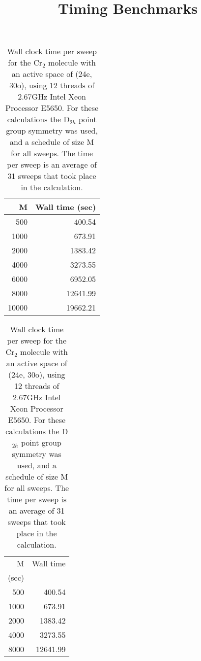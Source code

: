 \documentclass[letterpaper,12pt,notitlepage]{article}
\title{Timing Benchmarks}
\begin{document}

\begin{table}
\begin{center}
 \begin{tabular}{rr}
  \hline
  \hline
M& Wall time (sec)\\
\hline
500     &400.54\\
1000	&673.91\\
2000	&1383.42\\
4000	&3273.55\\
6000	&6952.05\\
8000	&12641.99\\
10000	&19662.21\\
\hline
  \hline
 \end{tabular}
\end{center}
\caption{Wall clock time per sweep for the Cr$_2$ molecule with an active space
of (24e, 30o), using 12 threads of 2.67GHz Intel Xeon Processor E5650. For
these calculations the D$_{2h}$ point group symmetry was used, and a schedule
of size M for all sweeps. The time per sweep is an average of 31 sweeps that
took place in the calculation.} \label{tab:timing}
\end{table}
\begin{table}
\begin{center}
 \begin{tabular}{rr}
  \hline
  \hline
M& Wall time\\ (sec)\\
\hline
500     &400.54\\
1000	&673.91\\
2000	&1383.42\\
4000	&3273.55\\
8000	&12641.99\\
\hline
  \hline
 \end{tabular}
\end{center}
\caption{Wall clock time per sweep for the Cr$_2$ molecule with an active space
of (24e, 30o), using 12 threads of 2.67GHz Intel Xeon Processor E5650. For
these calculations the D$_{2h}$ point group symmetry was used, and a schedule
of size M for all sweeps. The time per sweep is an average of 31 sweeps that
took place in the calculation.} \label{tab:timing2}
\end{table}
\end{document}
